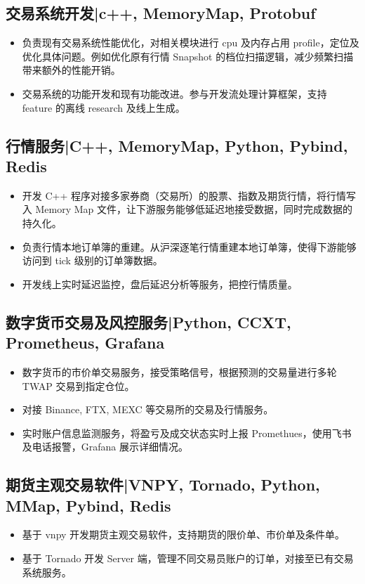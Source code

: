 \documentclass{resume}
\begin{document}
\subsection{\textbf{交易系统开发}|c++, MemoryMap, Protobuf}
\begin{itemize}
\item 负责现有交易系统性能优化，对相关模块进行 cpu 及内存占用 profile，定位及优化具体问题。例如优化原有行情 Snapshot 的档位扫描逻辑，减少频繁扫描带来额外的性能开销。
\item 交易系统的功能开发和现有功能改进。参与开发流处理计算框架，支持 feature 的离线 research 及线上生成。
\end{itemize}

\subsection{\textbf{行情服务}|C++, MemoryMap, Python, Pybind, Redis}
\begin{itemize}
\item 开发 C++ 程序对接多家券商（交易所）的股票、指数及期货行情，将行情写入 Memory Map 文件，让下游服务能够低延迟地接受数据，同时完成数据的持久化。
\item 负责行情本地订单簿的重建。从沪深逐笔行情重建本地订单簿，使得下游能够访问到 tick 级别的订单簿数据。
\item 开发线上实时延迟监控，盘后延迟分析等服务，把控行情质量。
\end{itemize}

\subsection{\textbf{数字货币交易及风控服务}|Python, CCXT, Prometheus, Grafana}
\begin{itemize}
\item 数字货币的市价单交易服务，接受策略信号，根据预测的交易量进行多轮 TWAP 交易到指定仓位。
\item 对接 Binance, FTX, MEXC 等交易所的交易及行情服务。
\item 实时账户信息监测服务，将盈亏及成交状态实时上报 Promethues，使用飞书及电话报警，Grafana 展示详细情况。
\end{itemize}

\subsection{\textbf{期货主观交易软件}|VNPY, Tornado, Python, MMap, Pybind, Redis}
\begin{itemize}
\item 基于 vnpy 开发期货主观交易软件，支持期货的限价单、市价单及条件单。
\item 基于 Tornado 开发 Server 端，管理不同交易员账户的订单，对接至已有交易系统服务。
\end{itemize}
\end{document}
